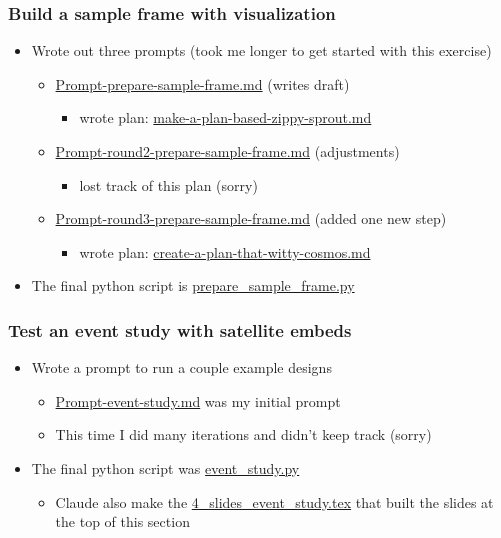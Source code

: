 \documentclass[aspectratio=169, 12pt]{beamer}
\newcommand{\ghLtwo}{https://tannerregan.github.io/GWU_AI_study_group/code/lecture_2/}
\begin{document}
\begin{frame}
\frametitle{Build a sample frame with visualization}
\begin{itemize}
    \item Wrote out three prompts (took me longer to get started with this exercise)
    \begin{itemize}
        \item \href{\ghLtwo/python_demo/Prompt-prepare-sample-frame.md}{Prompt-prepare-sample-frame.md} (writes draft)
        \begin{itemize}
            \item wrote plan: \href{\ghLtwo/python_demo/make-a-plan-based-zippy-sprout.md}{make-a-plan-based-zippy-sprout.md} 
        \end{itemize}
        \item \href{\ghLtwo/python_demo/Prompt-round2-prepare-sample-frame.md}{Prompt-round2-prepare-sample-frame.md} (adjustments)
        \begin{itemize}
            \item lost track of this plan (sorry)
        \end{itemize}
        \item \href{\ghLtwo/python_demo/Prompt-round3-prepare-sample-frame.md}{Prompt-round3-prepare-sample-frame.md} (added one new step)
        \begin{itemize}
            \item wrote plan: \href{\ghLtwo/python_demo/create-a-plan-that-witty-cosmos.md}{create-a-plan-that-witty-cosmos.md} 
        \end{itemize}
    \end{itemize}
    \item The final python script is \href{\ghLtwo/python_demo/prepare_sample_frame.py}{prepare\_sample\_frame.py}
\end{itemize}

\end{frame}

\begin{frame}
\frametitle{Test an event study with satellite embeds}
\begin{itemize}
    \item Wrote a prompt to run a couple example designs
    \begin{itemize}
        \item \href{\ghLtwo/python_demo/Prompt-event-study.md}{Prompt-event-study.md} was my initial prompt
        \item This time I did many iterations and didn't keep track (sorry)
    \end{itemize}
    \item The final python script was \href{\ghLtwo/python_demo/event_study.py}{event\_study.py}
    \begin{itemize}
        \item Claude also make the  \href{\ghLtwo/python_demo/4_slides_event_study.tex}{4\_slides\_event\_study.tex} that built the slides at the top of this section
    \end{itemize}
\end{itemize}
\end{frame}
\end{document}
